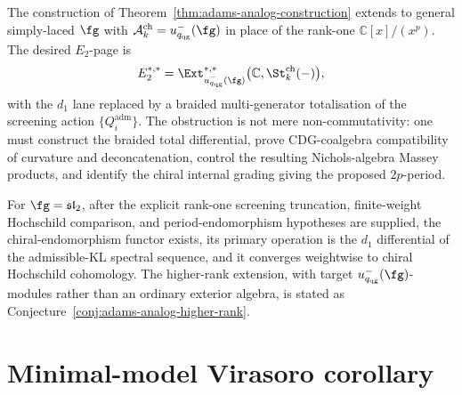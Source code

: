\begin{conjecture}
\label{conj:adams-analog-higher-rank}
%
The construction of Theorem~\ref{thm:adams-analog-construction}
extends to general simply-laced $\fg$ with
$\mathcal{A}^{\mathrm{ch}}_k = u_{q_{\mathrm{qg}}}^-(\fg)$ in place
of the rank-one $\mathbb{C}[x]/(x^p)$.  The desired $E_2$-page is
\[
E_2^{*,*}=
\Ext^{*,*}_{u_{q_{\mathrm{qg}}}^-(\fg)}
\bigl(\mathbb{C},\St^{\mathrm{ch}}_k(-)\bigr),
\]
with the $d_1$ lane replaced by a braided multi-generator
totalisation of the screening action
\(\{Q_i^{\mathrm{adm}}\}\).  The obstruction is not mere
non-commutativity: one must construct the braided total differential,
prove CDG-coalgebra compatibility of curvature and deconcatenation,
control the resulting Nichols-algebra Massey products, and identify
the chiral internal grading giving the proposed \(2p\)-period.
\end{conjecture}

\begin{corollary}
\label{cor:rank-one-primary-operation-comparison}
\ClaimStatusConditional
For $\fg = \mathfrak{sl}_2$, after the explicit rank-one screening
truncation, finite-weight Hochschild comparison, and period-endomorphism
hypotheses are supplied, the chiral-endomorphism functor exists, its
primary operation is the $d_1$ differential of the admissible-KL
spectral sequence, and it converges weightwise to chiral Hochschild
cohomology.  The higher-rank
extension, with target $u_{q_{\mathrm{qg}}}^-(\fg)$-modules rather
than an ordinary exterior algebra, is stated as
Conjecture~\ref{conj:adams-analog-higher-rank}.
\end{corollary}

\section{Minimal-model Virasoro corollary}
\label{sec:class-M-admissible}

